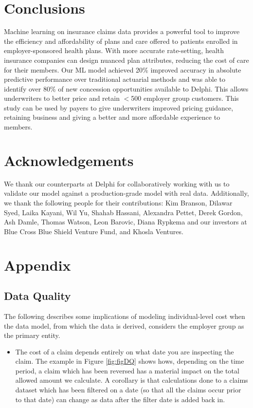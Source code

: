 \documentclass[letterpaper]{article} %
\begin{document}
\section*{Conclusions}
Machine learning on insurance claims data provides a powerful tool to improve the efficiency and affordability of plans and care offered to patients enrolled in employer-sponsored health plans. With more accurate rate-setting, health insurance companies can design nuanced plan attributes, reducing the cost of care for their members. Our ML model achieved 20\% improved accuracy in absolute predictive performance over traditional actuarial methods and was able to identify over 80\% of new concession opportunities available to Delphi. This allows underwriters to better price and retain $<$500 employer group customers. This study can be used by payers to give underwriters improved pricing guidance, retaining business and giving a better and more affordable experience to members.

\section*{Acknowledgements}
We thank our counterparts at Delphi for collaboratively working with us to validate our model against a production-grade model with real data.  Additionally, we thank the following people for their contributions: Kim Branson, Dilawar Syed, Laika Kayani, Wil Yu, Shahab Hassani, Alexandra Pettet, Derek Gordon, Ash Damle, Thomas Watson,  Leon Barovic, Diana Rypkema and our investors at Blue Cross Blue Shield Venture Fund, and Khosla Ventures.


\appendix
\newpage
\section{Appendix}

\subsection{Data Quality}\label{sec:a3}

The following describes some implications of modeling individual-level cost when the data model, from which the data is derived, considers the employer group as the primary entity.

\begin{itemize}
\item The cost of a claim depends entirely on what date you are inspecting the claim. The example in Figure \ref{fig:figDQ} shows hows, depending on the time period, a claim which has been reversed has a material impact on the total allowed amount we calculate. A corollary is that calculations done to a claims dataset which has been filtered on a date (so that all the claims occur prior to that date) can change as data after the filter date is added back in.
\end{itemize}
\end{document}
